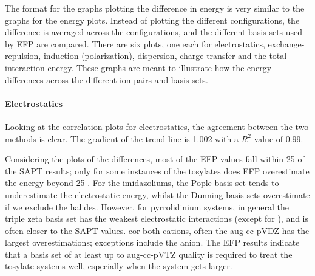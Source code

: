 \begin{multicols}{2}
The format for the graphs plotting the difference in energy is very similar to the graphs for the energy plots. 
Instead of plotting the different configurations, the difference is averaged across the configurations, and the different basis sets used by EFP are compared. 
There are six plots, one each for electrostatics, exchange-repulsion, induction (polarization), dispersion, charge-transfer and the total interaction energy.
These graphs are meant to illustrate how the energy differences across the different ion pairs and basis sets.





\paragraph{Electrostatics}
Looking at the correlation plots for electrostatics, the agreement between the two methods is clear.
The gradient of the trend line is 1.002 with a $R^2$ value of 0.99. 

Considering the plots of the differences, most of the EFP values fall within 25 \enUnit of the SAPT results; only for some instances of the tosylates does EFP overestimate the energy beyond 25 \enUnit. 
For the imidazoliums, the Pople basis set tends to underestimate the electrostatic energy, whilst the Dunning basis sets overestimate if we exclude the halides.
However, for pyrrolidinium systems, in general the triple zeta basis set has the weakest electrostatic interactions (except for \ntf), and is often closer to the SAPT values.
cor both cations, often the aug-cc-pVDZ has the largest overestimations; exceptions include the \ntf anion. 
The EFP results indicate that a basis set of at least up to aug-cc-pVTZ quality is required to treat the tosylate systems well, especially when the system gets larger. 



\end{multicols}
